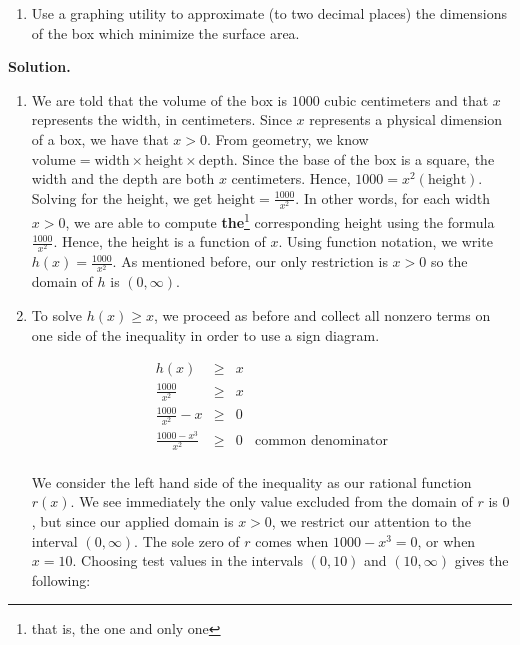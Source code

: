 \documentclass{ximera}
\begin{document}
\begin{example}
\begin{enumerate}
\item  Use a graphing utility  to approximate (to two decimal places) the dimensions of the box which minimize the surface area.

\end{enumerate}

{ \bf Solution.}

\begin{enumerate}

\item  We are told that the volume of the box is $1000$ cubic centimeters and that $x$ represents the width, in centimeters.  Since $x$ represents a physical dimension of a box, we have that $x>0$.  From geometry, we know $\text{volume} = \text{width} \times \text{height} \times \text{depth}$.  Since the base of the box is a square, the width and the depth are both $x$ centimeters.  Hence,  $1000 = x^2 (\text{height})$. Solving for the height, we get $\text{height} = \frac{1000}{x^2}$.   In other words, for each width $x>0$, we are able to compute \textbf{the}\footnote{that is, the one and only one} corresponding height using the formula $\frac{1000}{x^2}$.  Hence, the height is a function of $x$.    Using function notation, we write $h(x) = \frac{1000}{x^2}$.  As mentioned before, our only restriction is $x>0$ so the domain of $h$ is $(0, \infty)$.


\item  To solve $h(x) \geq x$, we proceed as before and collect all nonzero terms on one side of the inequality in order to use a sign diagram.

\[ \begin{array}{rclr}

h(x) & \geq & x & \\  

 \frac{1000}{x^2} & \geq & x & \\  

 \frac{1000}{x^2} - x & \geq & 0 \\  

 \frac{1000-x^3}{x^2} & \geq & 0 & \text{common denominator} \\ 

\end{array} \]

We consider the left hand side of the inequality as our rational function $r(x)$.  We see immediately the only value excluded from the domain of $r$ is $0$, but since our applied domain is $x>0$, we restrict our attention to the interval  $(0, \infty)$.  The sole zero of $r$ comes when $1000-x^3 = 0$,  or when $x=10$.  Choosing test values in the intervals $(0,10)$ and $(10, \infty)$ gives the following:


\end{enumerate}
\end{example}
\end{document}
